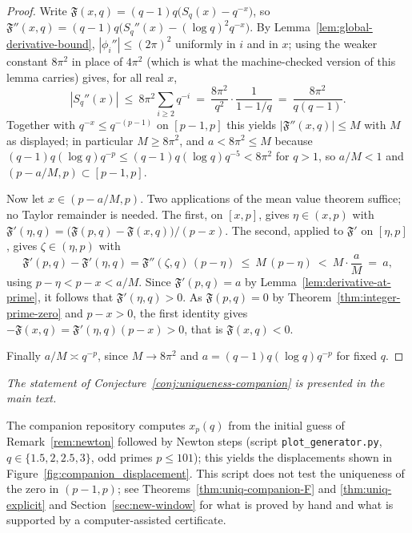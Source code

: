 \begin{proof}
Write $\mathfrak F(x,q)=(q-1)q\bigl(S_q(x)-q^{-x}\bigr)$, so
$\mathfrak F''(x,q)=(q-1)q\bigl(S_q''(x)-(\log q)^2q^{-x}\bigr)$. By
Lemma~\ref{lem:global-derivative-bound}, $|\phi_i''|\le(2\pi)^2$ uniformly in $i$ and in $x$;
using the weaker constant $8\pi^2$ in place of $4\pi^2$ (which is what the machine-checked
version of this lemma carries) gives, for all real $x$,
\[
|S_q''(x)|\ \le\ 8\pi^2\sum_{i\ge2}q^{-i}\ =\ \frac{8\pi^2}{q^2}\cdot\frac1{1-1/q}
\ =\ \frac{8\pi^2}{q(q-1)} .
\]
Together with $q^{-x}\le q^{-(p-1)}$ on $[p-1,p]$ this yields $|\mathfrak F''(x,q)|\le M$ with
$M$ as displayed; in particular $M\ge8\pi^2$, and $a<8\pi^2\le M$ because
$(q-1)q(\log q)q^{-p}\le(q-1)q(\log q)q^{-5}<8\pi^2$ for $q>1$, so $a/M<1$ and
$(p-a/M,p)\subset[p-1,p]$.

Now let $x\in(p-a/M,p)$. Two applications of the mean value theorem suffice; no Taylor
remainder is needed. The first, on $[x,p]$, gives $\eta\in(x,p)$ with
$\mathfrak F'(\eta,q)=\bigl(\mathfrak F(p,q)-\mathfrak F(x,q)\bigr)/(p-x)$. The second, applied
to $\mathfrak F'$ on $[\eta,p]$, gives $\zeta\in(\eta,p)$ with
\[
\mathfrak F'(p,q)-\mathfrak F'(\eta,q)=\mathfrak F''(\zeta,q)\,(p-\eta)\ \le\ M\,(p-\eta)
\ <\ M\cdot\frac aM\ =\ a ,
\]
using $p-\eta<p-x<a/M$. Since $\mathfrak F'(p,q)=a$ by
Lemma~\ref{lem:derivative-at-prime}, it follows that $\mathfrak F'(\eta,q)>0$. As
$\mathfrak F(p,q)=0$ by Theorem~\ref{thm:integer-prime-zero} and $p-x>0$, the first identity
gives $-\mathfrak F(x,q)=\mathfrak F'(\eta,q)(p-x)>0$, that is $\mathfrak F(x,q)<0$.

Finally $a/M\asymp q^{-p}$, since $M\to8\pi^2$ and $a=(q-1)q(\log q)q^{-p}$ for fixed $q$.
\end{proof}

\begin{center}\emph{The statement of Conjecture~\ref{conj:uniqueness-companion} is presented in the main text.}\end{center}

\begin{remark}
The companion repository computes $x_p(q)$ from the initial guess of Remark~\ref{rem:newton} followed by Newton steps (script \texttt{plot\_generator.py}, $q\in\{1.5,2,2.5,3\}$, odd primes $p\le101$); this yields the displacements shown in Figure~\ref{fig:companion_displacement}. This script does not test the uniqueness of the zero in $(p-1,p)$; see Theorems~\ref{thm:uniq-companion-F} and \ref{thm:uniq-explicit} and Section~\ref{sec:new-window} for what is proved by hand and what is supported by a computer-assisted certificate.
\end{remark}

